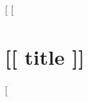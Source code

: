 \documentclass[letterpaper,openany,oneside,twocolumn]{book}
\begin{document}
[%
[%

\chapter*{[[ title ]]}
[%
\end{document}
